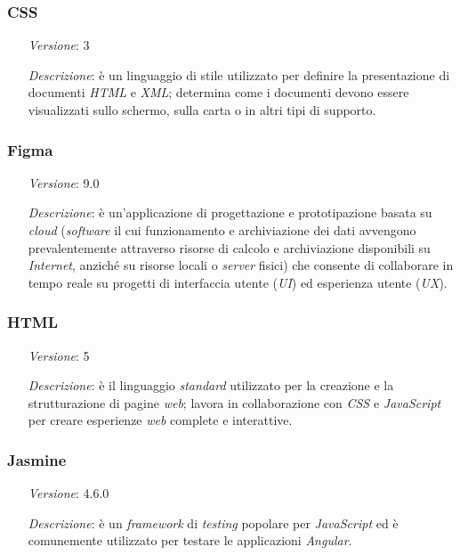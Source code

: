    \subsubsection*{CSS} %
    \label{subsubsec:css}
    \begin{itemize}[align=left]
        \item [\textit{Versione}:] 3
        \item [\textit{Descrizione}:] è un linguaggio di stile utilizzato per definire la presentazione di documenti \textit{HTML} e \textit{XML}; determina come i documenti devono essere visualizzati sullo schermo, sulla carta o in altri tipi di supporto.
    \end{itemize}

    \subsubsection*{Figma} %
    \begin{itemize}[align=left]
        \item [\textit{Versione}:] 9.0
        \item [\textit{Descrizione}:] è un'applicazione di progettazione e prototipazione basata su \textit{cloud} (\textit{software} il cui funzionamento e archiviazione dei dati avvengono prevalentemente attraverso risorse di calcolo e archiviazione disponibili su \textit{Internet}, anziché su risorse locali o \textit{server} fisici)
                    che consente di collaborare in tempo reale su progetti di interfaccia utente (\textit{UI}) ed esperienza utente (\textit{UX}).
    \end{itemize}

    \subsubsection*{HTML} %
    \label{subsubsec:html}
    \begin{itemize}[align=left]
        \item [\textit{Versione}:] 5
        \item [\textit{Descrizione}:] è il linguaggio \textit{standard} utilizzato per la creazione e la strutturazione di pagine \textit{web}; lavora in collaborazione con \textit{CSS} e \textit{JavaScript} per creare esperienze \textit{web} complete e interattive.
    \end{itemize}

    \subsubsection*{Jasmine} %
    \begin{itemize}[align=left]
        \item [\textit{Versione}:] 4.6.0
        \item [\textit{Descrizione}:] è un \textit{framework} di \textit{testing} popolare per \textit{JavaScript} ed è comunemente utilizzato per testare le applicazioni \textit{Angular}.
    \end{itemize}

